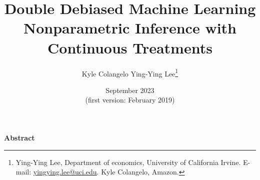 \documentclass[lettersize, 12pt]{article}
\begin{document}
\title{\Large 
Double Debiased Machine Learning Nonparametric Inference with Continuous Treatments
}






%
%




\author{\large Kyle Colangelo 
\hspace{0.6cm} 
Ying-Ying Lee\footnote{Ying-Ying Lee, Department of economics, University of California Irvine.
E-mail: \href{yingying.lee@uci.edu}{yingying.lee@uci.edu}.
Kyle Colangelo, Amazon.
}\vspace{-15pt}
}
\date{\normalsize September 2023\\[-8pt]
{\footnotesize (first version: February 2019)}
} 



\maketitle
\vspace{-25pt}

\begin{center}
{\bf \small Abstract}
\end{center}
\end{document}
